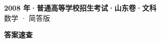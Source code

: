 \documentclass[zihao=-4, a4paper]{ctexart}
\begin{document}
\begin{center}
  {\Large\bfseries 2008 年·普通高等学校招生考试·山东卷·文科}\\[4pt]
  {\large 数学 · 简答版}
\end{center}
\medskip
{}

\clearpage
{}
\begin{center}{\Large\bfseries 答案速查}\end{center}
\medskip

\end{document}
